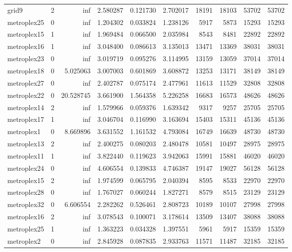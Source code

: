 \begin{longtable}{|l|r|r|r|r|r|r|r|r|r|}
grid9 & 2 & inf & 2.580287 & 0.121730 & 2.702017 & 18191 & 18103 & 53702 & 53702 \\
metroplex25 & 0 & inf & 1.204302 & 0.033824 & 1.238126 & 5917 & 5873 & 15293 & 15293 \\
metroplex15 & 1 & inf & 1.969484 & 0.066500 & 2.035984 & 8543 & 8481 & 22892 & 22892 \\
metroplex16 & 1 & inf & 3.048400 & 0.086613 & 3.135013 & 13471 & 13369 & 38031 & 38031 \\
metroplex23 & 0 & inf & 3.019719 & 0.095276 & 3.114995 & 13159 & 13059 & 37014 & 37014 \\
metroplex18 & 0 & 5.025063 & 3.007003 & 0.601869 & 3.608872 & 13253 & 13171 & 38149 & 38149 \\
metroplex27 & 0 & inf & 2.402787 & 0.075174 & 2.477961 & 11613 & 11529 & 32808 & 32808 \\
metroplex22 & 0 & 20.528745 & 3.661900 & 1.564358 & 5.226258 & 16683 & 16573 & 48626 & 48626 \\
metroplex14 & 2 & inf & 1.579966 & 0.059376 & 1.639342 & 9317 & 9257 & 25705 & 25705 \\
metroplex17 & 1 & inf & 3.046704 & 0.116990 & 3.163694 & 15403 & 15311 & 45136 & 45136 \\
metroplex1 & 0 & 8.669896 & 3.631552 & 1.161532 & 4.793084 & 16749 & 16639 & 48730 & 48730 \\
metroplex13 & 2 & inf & 2.400275 & 0.080203 & 2.480478 & 10581 & 10497 & 28975 & 28975 \\
metroplex11 & 1 & inf & 3.822440 & 0.119623 & 3.942063 & 15991 & 15881 & 46020 & 46020 \\
metroplex24 & 0 & inf & 4.606554 & 0.139833 & 4.746387 & 19147 & 19027 & 56128 & 56128 \\
metroplex15 & 2 & inf & 1.974599 & 0.065795 & 2.040394 & 8595 & 8533 & 22970 & 22970 \\
metroplex28 & 0 & inf & 1.767027 & 0.060244 & 1.827271 & 8579 & 8515 & 23129 & 23129 \\
metroplex32 & 0 & 6.606554 & 2.282262 & 0.526461 & 2.808723 & 10189 & 10107 & 27998 & 27998 \\
metroplex16 & 2 & inf & 3.078543 & 0.100071 & 3.178614 & 13509 & 13407 & 38088 & 38088 \\
metroplex25 & 1 & inf & 1.363223 & 0.034328 & 1.397551 & 5961 & 5917 & 15359 & 15359 \\
metroplex2 & 0 & inf & 2.845928 & 0.087835 & 2.933763 & 11571 & 11487 & 32185 & 32185 \\

\end{longtable}

